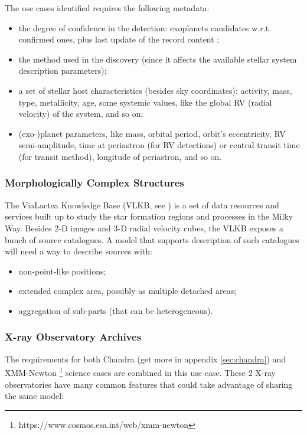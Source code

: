 The use cases identified requires the following metadata:
\begin{itemize}[noitemsep,topsep=0pt,parsep=0pt,partopsep=0pt]
	\item the degree of confidence in the detection: exoplanets candidates
w.r.t. confirmed ones, plus last update of the record content ;
	\item the method used in the discovery (since it affects the available
stellar system description parameters);
	\item a set of stellar host characteristics (besides sky coordinates):
activity, mass, type,
metallicity, age, some systemic values, like the global RV (radial
velocity) of the system, and so on;
	\item (exo-)planet parameters, like mass, orbital period, orbit's
eccentricity, RV semi-amplitude, time at periastron (for RV detections)
or central transit time (for transit method), longitude of periastron,
and so on.
\end{itemize}
 
 
\subsubsection{Morphologically Complex Structures}
The ViaLactea Knowledge Base (VLKB, see \cite{2016SPIE.9913E..0HM}) is a set of data
resources and services built up to study the star formation regions and
processes in the Milky Way. Besides 2-D images and 3-D radial velocity
cubes, the VLKB exposes a bunch of source catalogues.
A model that supports description of such catalogues will need a
way to describe sources with:
\begin{itemize}[noitemsep,topsep=0pt,parsep=0pt,partopsep=0pt]
	\item non-point-like positions;
	\item extended complex area, possibly as multiple detached areas;
	\item aggregation of sub-parts (that can be heterogeneous).
\end{itemize}

\subsubsection{X-ray Observatory Archives}

The requirements for both Chandra (get more in appendix \ref{sec:chandra})
and XMM-Newton \footnote{https://www.cosmos.esa.int/web/xmm-newton} science cases
are combined in this use case.
These 2 X-ray observatories have many common features that could take advantage of sharing the same model:

